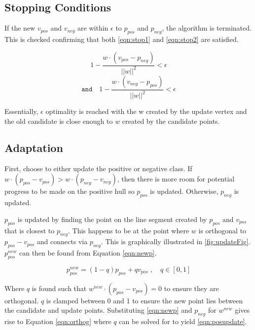 \documentclass[11pt]{article}
\theoremstyle{remark}	  \newtheorem*{remark}{Remark}
\numberwithin{equation}{section}
\begin{document}
\subsection{Stopping Conditions}

If the new $v_{pos}$ and $v_{neg}$ are within $\epsilon$ to $p_{pos}$ and $p_{neg}$, the algorithm is terminated. This is checked confirming that both \ref{eqn:stop1} and \ref{eqn:stop2} are satisfied.

\begin{equation}
1-\frac{w \cdot (v_{pos}-p_{neg})}{||w||^{2}} < \epsilon
\label{eqn:stop1}
\end{equation}
\begin{equation}
\texttt{and} \quad 1-\frac{w \cdot (v_{neg}-p_{pos})}{||w||^{2}} < \epsilon
\label{eqn:stop2}
\end{equation}

Essentially, $\epsilon$ optimality is reached with the w created by the update vertex and the old candidate is close enough to $w$ created by the candidate points.

\subsection{Adaptation}

First, choose to either update the positive or negative class. If $w \cdot (p_{pos} - v_{pos}) > w \cdot (p_{neg} - v_{neg})$, then there is more room for potential progress to be made on the positive hull so $p_{pos}$ is updated. Otherwise, $p_{neg}$ is updated.

$p_{pos}$ is updated by finding the point on the line segment created by $p_{pos}$ and $v_{pos}$ that is closest to $p_{neg}$. This happens to be at the point where $w$ is orthogonal to $p_{pos}-v_{pos}$ and connects via $p_{neg}$. This is graphically illustrated in \ref{fig:updateFig}. $p_{pos}^{new}$ can then be found from Equation \ref{eqn:newp}.

\begin{equation}
p_{pos}^{new} = (1-q)p_{pos}+q v_{pos}\;, \quad q\in[0,1]
\label{eqn:newp}
\end{equation}

Where $q$ is found such that $w^{new} \cdot (p_{pos}-v_{pos}) = 0$ to ensure they are orthogonal. $q$ is clamped between 0 and 1 to ensure the new point lies between the candidate and update points. Substituting \ref{eqn:newp} and $p_{neg}$ for $w^{new}$ gives rise to Equation \ref{eqn:orthog} where $q$ can be solved for to yield \ref{eqn:posupdate}.
\end{document}
